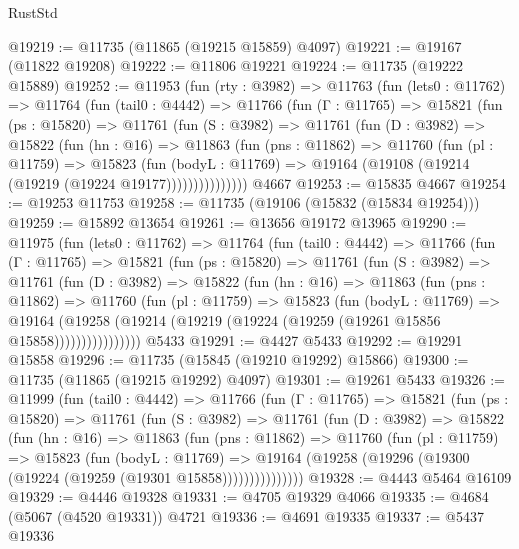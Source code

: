 \begin{lexlean}{RustStd}
\begin{coremodule}
@19219 := @11735 (@11865 (@19215 @15859) @4097)
@19221 := @19167 (@11822 @19208)
@19222 := @11806 @19221
@19224 := @11735 (@19222 @15889)
@19252 := @11953
    (fun (rty : @3982) =>
    @11763
      (fun (lets0 : @11762) =>
      @11764
        (fun (tail0 : @4442) =>
        @11766
          (fun (Γ : @11765) =>
          @15821
            (fun (ps : @15820) =>
            @11761
              (fun (S : @3982) =>
              @11761
                (fun (D : @3982) =>
                @15822
                  (fun (hn : @16) =>
                  @11863
                    (fun (pns : @11862) =>
                    @11760
                      (fun (pl : @11759) =>
                      @15823
                        (fun (bodyL : @11769) =>
                        @19164 (@19108 (@19214 (@19219 (@19224 @19177)))))))))))))))
    @4667
@19253 := @15835 @4667
@19254 := @19253 @11753
@19258 := @11735 (@19106 (@15832 (@15834 @19254)))
@19259 := @15892 @13654
@19261 := @13656 @19172 @13965
@19290 := @11975
    (fun (lets0 : @11762) =>
    @11764
      (fun (tail0 : @4442) =>
      @11766
        (fun (Γ : @11765) =>
        @15821
          (fun (ps : @15820) =>
          @11761
            (fun (S : @3982) =>
            @11761
              (fun (D : @3982) =>
              @15822
                (fun (hn : @16) =>
                @11863
                  (fun (pns : @11862) =>
                  @11760
                    (fun (pl : @11759) =>
                    @15823
                      (fun (bodyL : @11769) =>
                      @19164
                        (@19258
                          (@19214 (@19219 (@19224 (@19259 (@19261 @15856 @15858))))))))))))))))
    @5433
@19291 := @4427 @5433
@19292 := @19291 @15858
@19296 := @11735 (@15845 (@19210 @19292) @15866)
@19300 := @11735 (@11865 (@19215 @19292) @4097)
@19301 := @19261 @5433
@19326 := @11999
    (fun (tail0 : @4442) =>
    @11766
      (fun (Γ : @11765) =>
      @15821
        (fun (ps : @15820) =>
        @11761
          (fun (S : @3982) =>
          @11761
            (fun (D : @3982) =>
            @15822
              (fun (hn : @16) =>
              @11863
                (fun (pns : @11862) =>
                @11760
                  (fun (pl : @11759) =>
                  @15823
                    (fun (bodyL : @11769) =>
                    @19164 (@19258 (@19296 (@19300 (@19224 (@19259 (@19301 @15858)))))))))))))))
@19328 := @4443 @5464 @16109
@19329 := @4446 @19328
@19331 := @4705 @19329 @4066
@19335 := @4684 (@5067 (@4520 @19331)) @4721
@19336 := @4691 @19335
@19337 := @5437 @19336

\end{coremodule}
\end{lexlean}
